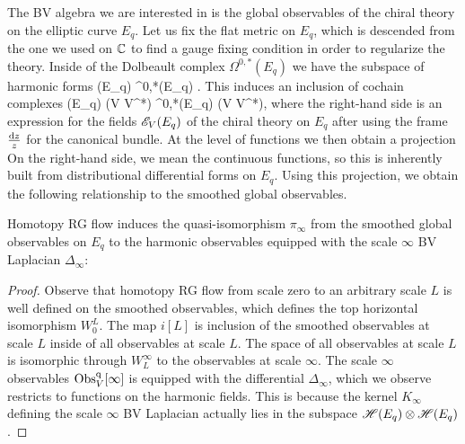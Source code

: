 \documentclass[10pt]{amsart}
\begin{document}
The BV algebra we are interested in is the global observables of the chiral theory on the elliptic curve $E_q$.
Let us fix the flat metric on $E_q$, which is descended from the one we used on $\mathbb C$ to find a gauge fixing condition in order to regularize the theory. 
Inside of the Dolbeault complex $\Omega^{0,*}(E_q)$ we have the subspace of harmonic forms
\ben
\sH(E_q) \subset \Omega^{0,*}(E_q) .
\een 
This induces an inclusion of cochain complexes
\be\label{harmonics}
\sH(E_q) \tensor (V \oplus {} V^*) \hookrightarrow \Omega^{0,*}(E_q) \tensor (V \oplus {} V^*),
\ee
where the right-hand side is an expression for the fields $\mathscr E_V(E_q)$ of the chiral theory on $E_q$ after using the frame $\frac{{\rm d} z}{z}$ for the canonical bundle. 
At the level of functions we then obtain a projection
\ben
{}
\een
On the right-hand side, we mean the continuous functions, so this is inherently built from distributional differential forms on $E_q$. 
Using this projection, we obtain the following relationship to the smoothed global observables.

\begin{lem} Homotopy RG flow induces the quasi-isomorphism $\pi_\infty$ from the smoothed global observables on $E_q$ to the harmonic observables equipped with the scale $\infty$ BV Laplacian $\Delta_\infty$:
\ben
{}
\een 
\end{lem}
\begin{proof}
Observe that homotopy RG flow from scale zero to an arbitrary scale $L$ is well defined on the smoothed observables, which defines the top horizontal isomorphism $W_0^L$. 
The map $i[L]$ is inclusion of the smoothed observables at scale $L$ inside of all observables at scale $L$. 
The space of all observables at scale $L$ is isomorphic through $W_L^\infty$ to the observables at scale $\infty$. 
The scale $\infty$ observables ${\rm Obs}_V^{\rm q}[\infty]$ is equipped with the differential $\Delta_\infty$, which we observe restricts to functions on the harmonic fields. 
This is because the kernel $K_\infty$ defining the scale $\infty$ BV Laplacian actually lies in the subspace $\mathscr H(E_q) \otimes \mathscr H(E_q)$. 
\end{proof}
\end{document}
